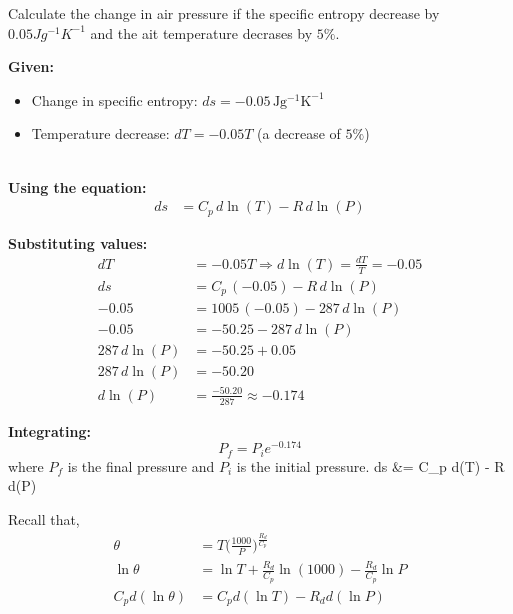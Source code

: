 \documentclass[fleqn,10pt]{SelfArx} %
\begin{document}
\begin{question}[\label=17.1]{Calculate the change in air pressure if the specific entropy decrease by $0.05 Jg^{-1}K^{-1}$ and the ait temperature decrases by $5\%$.}
\Rightarrow  {}


    \textbf{Given:}
    \begin{itemize}[noitemsep]
        \item Change in specific entropy: \( ds = -0.05 \, \mathrm{Jg^{-1}K^{-1}} \)
        \item Temperature decrease: \( dT = -0.05T \) (a decrease of \( 5\% \))
    \end{itemize}
 \\
    \textbf{Using the equation:}
    \begin{align*}
        ds &= C_p \, d\ln(T) - R \, d\ln(P)
    \end{align*}

    \textbf{Substituting values:}
    \begin{align*}
        dT &= -0.05T \Rightarrow d\ln(T) = \frac{dT}{T} = -0.05 \\
        ds &= C_p \, (-0.05) - R \, d\ln(P) \\
        -0.05 &= 1005 \, (-0.05) - 287 \, d\ln(P) \\
        -0.05 &= -50.25 - 287 \, d\ln(P) \\
        287 \, d\ln(P) &= -50.25 + 0.05 \\
        287 \, d\ln(P) &= -50.20 \\
        d\ln(P) &= \frac{-50.20}{287} \approx -0.174
    \end{align*}

    \textbf{Integrating:}
    \[
    P_f = P_i e^{-0.174}
    \]
    where \( P_f \) is the final pressure and \( P_i \) is the initial pressure.   ds &= C_p d\ln(T) - R d\ln(P)
\end{question}

Recall that,
\begin{align}
    \theta &= T\Big(\frac{1000}{P}\Big)^{\frac{R_d}{C_p}} \\
    \ln \theta &= \ln T + \frac{R_d}{C_p}\ln(1000) - \frac{R_d}{C_p}\ln P \\ 
    C_p d(\ln \theta) &= C_p d(\ln T) - R_d d(\ln P) \label{eq:2ndLaw1}
\end{align}
\end{document}
